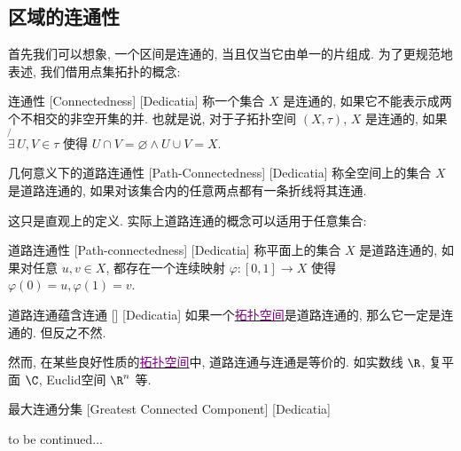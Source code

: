 \documentclass[UTF8]{ctexart}
\newcommand{\hyperrefc}[2]{\hyperref[#1]{\textcolor{purple}{#2}}}
\newcommand{\continued}{{\Large to be continued...}}
\begin{document}
\subsection{区域的连通性}
首先我们可以想象, 一个区间是连通的, 当且仅当它由单一的片组成. 为了更规范地表述, 我们借用点集拓扑的概念:
\begin{dfn}
    [UUID]
    {连通性}
    [Connectedness]
    [Dedicatia]
    称一个集合 \( X \) 是连通的, 如果它不能表示成两个不相交的非空开集的并. 也就是说, 对于子拓扑空间 \( (X,\tau) \),  \( X \) 是连通的, 如果 \( \not{\exists}\,U,V\in\tau \) 使得 \( U\cap V=\varnothing\land U\cup V=X \).
\end{dfn}
\begin{dfn}
    [UUID]
    {几何意义下的道路连通性}
    [Path-Connectedness]
    [Dedicatia]
    称全空间上的集合 \( X \) 是道路连通的, 如果对该集合内的任意两点都有一条折线将其连通. 
\end{dfn}
这只是直观上的定义. 实际上道路连通的概念可以适用于任意集合: 
\begin{dfn}
    [UUID]
    {道路连通性}
    [Path-connectedness]
    [Dedicatia]
    称平面上的集合 \( X \) 是道路连通的, 如果对任意 \( u,v\in X \), 都存在一个连续映射 \( \varphi:[0,1]\to X \) 使得 \( \varphi(0)=u, \varphi(1)=v \).
\end{dfn}
\begin{thm}
    [UUID]
    {道路连通蕴含连通}
    []
    [Dedicatia]
    如果一个\hyperrefc{dfn:TopologicalSpace}{拓扑空间}是道路连通的, 那么它一定是连通的. 但反之不然. 
\end{thm}
然而, 在某些良好性质的\hyperrefc{dfn:TopologicalSpace}{拓扑空间}中, 道路连通与连通是等价的. 如实数线 \( \R \), 复平面 \( \C \), Euclid空间 \( \R^n \) 等. 
\begin{dfn}
    [UUID]
    {最大连通分集}
    [Greatest Connected Component]
    [Dedicatia]
\end{dfn}
\continued
\end{document}
